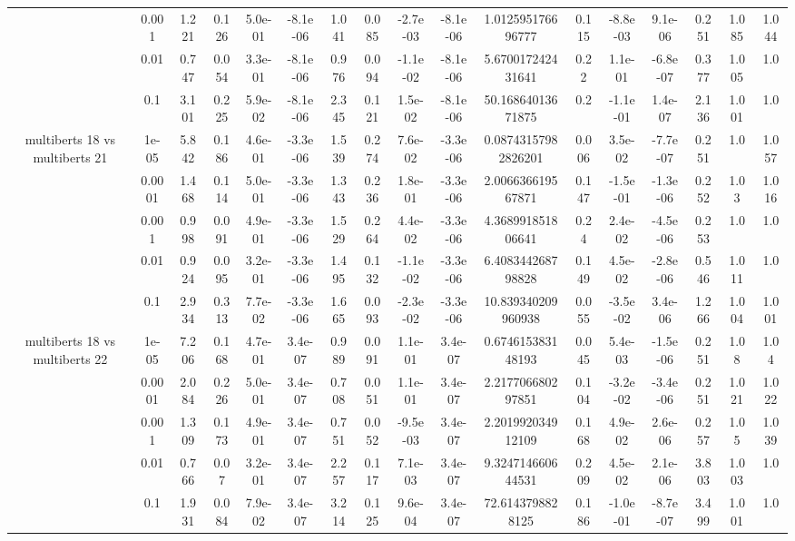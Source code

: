 \begin{tabular}{|c|c|c|c|c|c|c|c|c|c|c|c|c|c|c|c|c|}
 & 0.001 & 1.221 & 0.126 & 5.0e-01 & -8.1e-06 & 1.041 & 0.085 & -2.7e-03 & -8.1e-06 & 1.012595176696777 & 0.115 & -8.8e-03 & 9.1e-06 & 0.251 & 1.085 & 1.044 \\
 & 0.01 & 0.747 & 0.054 & 3.3e-01 & -8.1e-06 & 0.976 & 0.094 & -1.1e-02 & -8.1e-06 & 5.670017242431641 & 0.22 & 1.1e-01 & -6.8e-07 & 0.377 & 1.005 & 1.0 \\
 & 0.1 & 3.101 & 0.225 & 5.9e-02 & -8.1e-06 & 2.345 & 0.121 & 1.5e-02 & -8.1e-06 & 50.16864013671875 & 0.2 & -1.1e-01 & 1.4e-07 & 2.136 & 1.001 & 1.0 \\
\hline
\multirow{5}{*}{multiberts 18 vs multiberts 21} & 1e-05 & 5.842 & 0.186 & 4.6e-01 & -3.3e-06 & 1.539 & 0.274 & 7.6e-02 & -3.3e-06 & 0.08743157982826201 & 0.006 & 3.5e-02 & -7.7e-07 & 0.251 & 1.0 & 1.057 \\
 & 0.0001 & 1.468 & 0.114 & 5.0e-01 & -3.3e-06 & 1.343 & 0.236 & 1.8e-01 & -3.3e-06 & 2.006636619567871 & 0.147 & -1.5e-01 & -1.3e-06 & 0.252 & 1.03 & 1.016 \\
 & 0.001 & 0.998 & 0.091 & 4.9e-01 & -3.3e-06 & 1.529 & 0.264 & 4.4e-02 & -3.3e-06 & 4.368991851806641 & 0.24 & 2.4e-02 & -4.5e-06 & 0.253 & 1.0 & 1.0 \\
 & 0.01 & 0.924 & 0.095 & 3.2e-01 & -3.3e-06 & 1.495 & 0.132 & -1.1e-02 & -3.3e-06 & 6.408344268798828 & 0.149 & 4.5e-02 & -2.8e-06 & 0.546 & 1.011 & 1.0 \\
 & 0.1 & 2.934 & 0.313 & 7.7e-02 & -3.3e-06 & 1.665 & 0.093 & -2.3e-02 & -3.3e-06 & 10.839340209960938 & 0.055 & -3.5e-02 & 3.4e-06 & 1.266 & 1.004 & 1.001 \\
\hline
\multirow{5}{*}{multiberts 18 vs multiberts 22} & 1e-05 & 7.206 & 0.168 & 4.7e-01 & 3.4e-07 & 0.989 & 0.091 & 1.1e-01 & 3.4e-07 & 0.674615383148193 & 0.045 & 5.4e-03 & -1.5e-06 & 0.251 & 1.08 & 1.04 \\
 & 0.0001 & 2.084 & 0.226 & 5.0e-01 & 3.4e-07 & 0.708 & 0.051 & 1.1e-01 & 3.4e-07 & 2.217706680297851 & 0.104 & -3.2e-02 & -3.4e-06 & 0.251 & 1.021 & 1.022 \\
 & 0.001 & 1.309 & 0.173 & 4.9e-01 & 3.4e-07 & 0.751 & 0.052 & -9.5e-03 & 3.4e-07 & 2.201992034912109 & 0.168 & 4.9e-02 & 2.6e-06 & 0.257 & 1.05 & 1.039 \\
 & 0.01 & 0.766 & 0.07 & 3.2e-01 & 3.4e-07 & 2.257 & 0.117 & 7.1e-03 & 3.4e-07 & 9.324714660644531 & 0.209 & 4.5e-02 & 2.1e-06 & 3.803 & 1.003 & 1.0 \\
 & 0.1 & 1.931 & 0.084 & 7.9e-02 & 3.4e-07 & 3.214 & 0.125 & 9.6e-04 & 3.4e-07 & 72.6143798828125 & 0.186 & -1.0e-01 & -8.7e-07 & 3.499 & 1.001 & 1.0 \\

\end{tabular}
